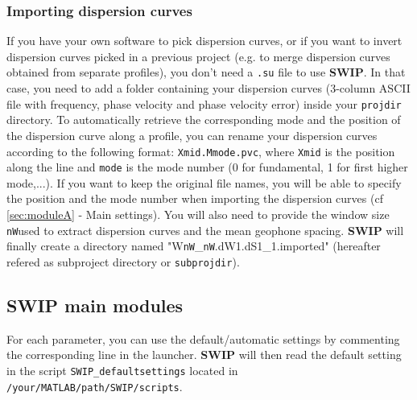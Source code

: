 \documentclass[twoside,a4paper]{article}
\def\SWIP{\textbf{SWIP}}
\begin{document}
\subsubsection{Importing dispersion curves}
\label{sec:import}
If you have your own software to pick dispersion curves, or if you want to invert dispersion curves picked in a previous project (e.g. to merge dispersion curves obtained from separate profiles), you don't need a \verb|.su| file to use {\SWIP}. In that case, you need to add a folder containing your dispersion curves (3-column ASCII file with frequency, phase velocity and phase velocity error) inside your \verb|projdir| directory. To automatically retrieve the corresponding mode and the position of the dispersion curve along a profile, you can rename your dispersion curves according to the following format: \verb|Xmid.Mmode.pvc|, where \verb|Xmid| is the position along the line and \verb|mode| is the mode number (0 for fundamental, 1 for first higher mode,...). If you want to keep the original file names, you will be able to specify the position and the mode number when importing the dispersion curves (cf \ref{sec:moduleA} - Main settings). You will also need to provide the window size \verb|nW|used to extract dispersion curves and the mean geophone spacing. {\SWIP} will finally create a directory named "W\verb|nW|\_\verb|nW|.dW1.dS1\_1.imported" (hereafter refered as subproject directory or \verb|subprojdir|).

\clearpage
\subsection{SWIP main modules}
For each parameter, you can use the default/automatic settings by commenting the corresponding line in the launcher. {\SWIP} will then read the default setting in the script \verb|SWIP_defaultsettings| located in \verb|/your/MATLAB/path/SWIP/scripts|.


\end{document}
